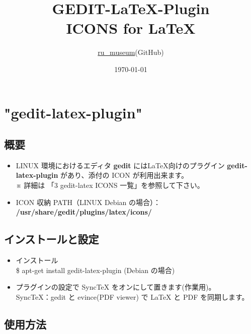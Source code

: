 \documentclass[10pt]{ltjarticle}
\title{{\fs{24.88}GEDIT-LaTeX-Plugin \\ ICONS for \LaTeX{}}\\ \vspace{10mm}{\fs{12} \textbf{[ PNG 版 ]}}\vspace{130mm}}
\author{\href{https://github.com/ru-museum/}{ru\_museum}(GitHub)}
\date{\today}
\begin{document}
\begin{titlepage}
  \maketitle
	\vspace{\fill}
\thispagestyle{empty}
\end{titlepage}

\newpage

\section{"gedit-latex-plugin"}
\subsection{概要}

\begin{itemize}
  \item LINUX 環境におけるエディタ \textbf{gedit} には\LaTeX{}向けのプラグイン \textbf{gedit-latex-plugin} があり、添付の ICON が利用出来ます。\\ 
※ 詳細は 「3 gedit-latex ICONS 一覧」を参照して下さい。
  
  \item ICON 収納 PATH（LINUX Debian の場合）：\\
  \textbf{/usr/share/gedit/plugins/latex/icons/} 

\end{itemize}

\subsection{インストールと設定}

\begin{itemize}
  \item インストール\\ 
        \$ apt-get install gedit-latex-plugin (Debian の場合) \\
\vspace{-6mm}
  \item プラグインの設定で SyncTeX をオンにして置きます(作業用)。\\ 
SyncTeX：gedit と evince(PDF viewer) で LaTeX と PDF を同期します。
\end{itemize}

\subsection{使用方法}
\end{document}
